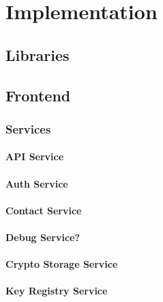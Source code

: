\chapter{Implementation}\label{ch:implementation}

\lipsum[2-4]

\section{Libraries}

\section{Frontend}

\subsection{Services}

\subsubsection{API Service}

\subsubsection{Auth Service}

\subsubsection{Contact Service}

\subsubsection{Debug Service?}

\subsubsection{Crypto Storage Service}

\subsubsection{Key Registry Service}

